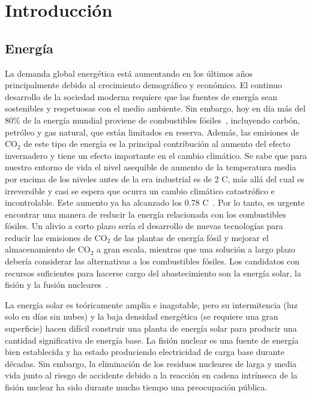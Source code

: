 \chapter{Introducción}\label{ch:intro}
\section{Energía}\label{sec:energy}
La demanda global energética está aumentando en los últimos años principalmente debido al crecimiento demográfico y económico.
El continuo desarrollo de la sociedad moderna requiere que las fuentes de energía sean sostenibles
y respetuosas con el medio ambiente. Sin embargo, hoy en día más del 80\% de la energía mundial proviene
de combustibles fósiles~\cite{/content/publication/caf32f3b-en}, incluyendo carbón, petróleo y gas natural, que están limitados en reserva.
Además, las emisiones de CO$_2$ de este tipo de energía es la principal contribución al aumento del 
efecto invernadero y tiene un efecto importante en el cambio climático. Se
sabe que para nuestro entorno de vida el nivel asequible de aumento de la
temperatura media por encima de los niveles antes de la era industrial es de 2 \centigrade C, más allá del cual es irreversible y casi
se espera que ocurra un cambio climático catastrófico e incontrolable. Este aumento ya ha alcanzado los 0.78 \centigrade C~\cite{ip02000c}.
Por lo tanto, es urgente encontrar una manera de reducir la energía relacionada con
los combustibles fósiles. Un alivio a corto plazo sería el desarrollo de nuevas tecnologías para
reducir las emisiones de CO$_2$ de las plantas de energía fósil y mejorar el almacenamiento de CO$_2$ a gran escala,
mientras que una solución a largo plazo debería considerar las alternativas a los combustibles fósiles. Los candidatos con recursos suficientes para hacerse cargo del abastecimiento son la energía solar, la fisión y
la fusión nucleares~\cite{Freidberg:1186225}.\par
La energía solar es teóricamente amplia e inagotable, pero su intermitencia (luz solo en días sin nubes) y la baja densidad energética (se requiere una gran superficie) hacen difícil construir
una planta de energía solar para producir una cantidad significativa de energía base. La fisión nuclear es
una fuente de energía bien establecida y ha estado produciendo electricidad de carga base durante décadas.
Sin embargo, la eliminación de los residuos nucleares de larga y media vida junto al riesgo de accidente debido a la
reacción en cadena intrínseca de la fisión nuclear ha sido durante mucho tiempo una preocupación pública.\par
